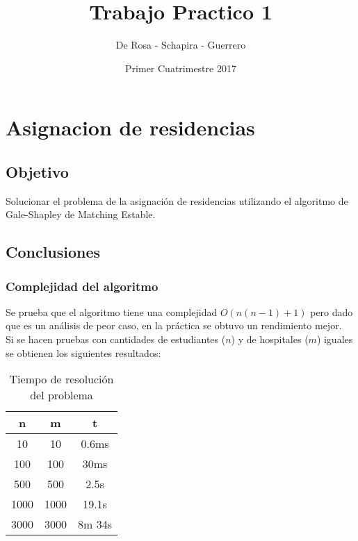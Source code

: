 \documentclass{article}
\title{Trabajo Practico 1}
\author{De Rosa - Schapira - Guerrero}
\date{Primer Cuatrimestre 2017}
\begin{document}
    \maketitle
    \newpage
    \tableofcontents
    \newpage

    \section{Asignacion de residencias}
        \subsection{Objetivo}
            Solucionar el problema de la asignación de residencias utilizando
            el algoritmo de Gale-Shapley de Matching Estable.
        \subsection{Conclusiones}
            \subsubsection{Complejidad del algoritmo}
                Se prueba que el algoritmo tiene una complejidad $O(n(n-1) + 1)$ pero
                dado que es un análisis de peor caso, en la práctica se obtuvo un rendimiento
                mejor. \\
                Si se hacen pruebas con cantidades de estudiantes ($n$) y de hospitales
                ($m$) iguales se obtienen los siguientes resultados:
                \begin{table}[h!]
                    \centering
                    \caption{Tiempo de resolución del problema}
                    \begin{tabular}{c|c|c}
                        n & m & t \\
                        \hline
                        10 & 10 & 0.6ms \\
                        \hline
                        100 & 100 & 30ms \\
                        \hline
                        500 & 500 & 2.5s \\
                        \hline
                        1000 & 1000 & 19.1s \\
                        \hline
                        3000 & 3000 & 8m 34s
                    \end{tabular}
                \end{table}
\end{document}
